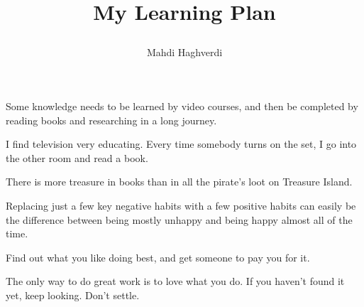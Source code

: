 \documentclass[12pt, dvipsnames, svgnames, x11names, oneside]{book}
\title{\roundpic[xshift=-3mm,yshift=-5mm]{5.8cm}{9cm}{./images/lamp}\vspace{3mm}
	
	My Learning Plan
}
\author{Mahdi Haghverdi}
\begin{document}
	
	\frontmatter
	\tableofcontents
	\clearpage
	
	\mainmatter		
	
	\begin{savequote}[80mm]
		Some knowledge needs to be learned by video courses, and then be completed by reading books and researching in a long journey.
	\end{savequote}
		
	
	\begin{savequote}[80mm]
		I find television very educating. Every time somebody turns on the set, I go into the other room and read a book.
		
		There is more treasure in books than in all the pirate’s loot on Treasure Island.
	\end{savequote}
		
	
	\begin{savequote}[80mm]
		Replacing just a few key negative habits with a few positive habits can easily be the difference between being mostly unhappy and being happy almost all of the time.
	\end{savequote}
	
	
	\begin{savequote}[80mm]
		Find out what you like doing best, and get someone to pay you for it.
		
		The only way to do great work is to love what you do. If you haven't found it yet, keep looking. Don't settle.
	\end{savequote}
	
\end{document}
